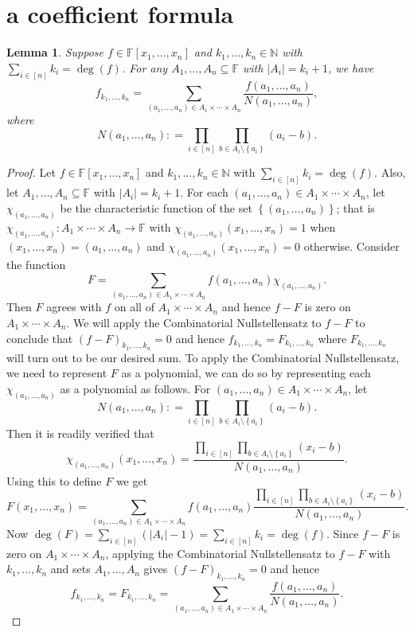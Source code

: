 \documentclass{amsbook}
\theoremstyle{plain}
\newtheorem{lemma}{Lemma}
\numberwithin{equation}{chapter}
\newcommand{\set}[1]{\left\{ #1 \right\}}
\newcommand{\card}[1]{\left|#1\right|}
\newcommand{\func}[3]{#1\colon #2 \rightarrow #3}
\newcommand{\irange}[1]{\left[#1\right]}
\newcommand{\DefinedAs}{\mathrel{\mathop:}=}
\newcommand{\IN}{\mathbb{N}}
\begin{document}
\section*{a coefficient formula}
\begin{lemma}
Suppose $f \in \mathbb{F}[x_1, \ldots, x_n]$ and $k_1, \ldots, k_n \in \IN$ with $\sum_{i \in \irange{n}} k_i = \deg(f)$.  For any $A_1, \ldots, A_n \subseteq \mathbb{F}$ with $\card{A_i} = k_i + 1$, we have
\[f_{k_1, \ldots, k_n} = \sum_{(a_1, \ldots, a_n) \in A_1 \times \cdots \times A_n} \frac{f(a_1, \ldots, a_n)}{N(a_1, \ldots, a_n)},\]
where
\[N(a_1, \ldots, a_n) \DefinedAs \prod_{i \in \irange{n}} \prod_{b \in A_i \setminus \set{a_i}} (a_i - b).\]
\end{lemma}
\begin{proof}
Let $f \in \mathbb{F}[x_1, \ldots, x_n]$ and $k_1, \ldots, k_n \in \IN$ with $\sum_{i \in \irange{n}} k_i = \deg(f)$. Also, let $A_1, \ldots, A_n \subseteq \mathbb{F}$ with $\card{A_i} = k_i + 1$.  For each $(a_1, \ldots, a_n) \in A_1 \times \cdots \times A_n$, let $\chi_{(a_1, \ldots, a_n)}$ be the characteristic function of the set $\set{(a_1, \ldots, a_n)}$; that is $\func{\chi_{(a_1, \ldots, a_n)}}{A_1 \times \cdots \times A_n}{\mathbb{F}}$ with $\chi_{(a_1, \ldots, a_n)}(x_1, \ldots, x_n) = 1$ when $(x_1, \ldots, x_n) = (a_1, \ldots, a_n)$ and $\chi_{(a_1, \ldots, a_n)}(x_1, \ldots, x_n) = 0$ otherwise.  Consider the function
\[F = \sum_{(a_1, \ldots, a_n) \in A_1 \times \cdots \times A_n} f(a_1, \ldots, a_n)\chi_{(a_1, \ldots, a_n)}.\]
Then $F$ agrees with $f$ on all of $A_1 \times \cdots \times A_n$ and hence $f - F$ is zero on $A_1 \times \cdots \times A_n$.  We will apply the Combinatorial Nullstellensatz to $f - F$ to conclude that $(f-F)_{k_1, \ldots, k_n} = 0$ and hence $f_{k_1, \ldots, k_n} = F_{k_1, \ldots, k_n}$ where  $F_{k_1, \ldots, k_n}$ will turn out to be our desired sum.  To apply the Combinatorial Nullstellensatz, we need to represent $F$ as a polynomial, we can do so by representing each $\chi_{(a_1, \ldots, a_n)}$ as a polynomial as follows.  For $(a_1, \ldots, a_n) \in A_1 \times \cdots \times A_n$, let 
\[N(a_1, \ldots, a_n) \DefinedAs \prod_{i \in \irange{n}} \prod_{b \in A_i \setminus \set{a_i}} (a_i - b).\]
\noindent Then it is readily verified that
\[\chi_{(a_1, \ldots, a_n)}(x_1, \ldots, x_n) = \frac{\prod_{i \in \irange{n}} \prod_{b \in A_i \setminus \set{a_i}} (x_i - b)}{N(a_1, \ldots, a_n)}.\]
\noindent Using this to define $F$ we get 
\[F(x_1, \ldots, x_n) = \sum_{(a_1, \ldots, a_n) \in A_1 \times \cdots \times A_n} f(a_1, \ldots, a_n)\frac{\prod_{i \in \irange{n}} \prod_{b \in A_i \setminus \set{a_i}} (x_i - b)}{N(a_1, \ldots, a_n)}.\]
Now  $\deg(F) = \sum_{i \in \irange{n}} (|A_i| - 1) = \sum_{i \in \irange{n}} k_i = \deg(f)$.  Since $f - F$ is zero on $A_1 \times \cdots \times A_n$, applying the Combinatorial Nullstellensatz to $f - F$ with $k_1, \ldots, k_n$ and sets $A_1, \ldots, A_n$ gives $(f-F)_{k_1, \ldots, k_n} = 0$ and hence 
\[f_{k_1, \ldots, k_n} = F_{k_1, \ldots, k_n} = \sum_{(a_1, \ldots, a_n) \in A_1 \times \cdots \times A_n} \frac{f(a_1, \ldots, a_n)}{N(a_1, \ldots, a_n)}.\]
\end{proof}
\end{document}
